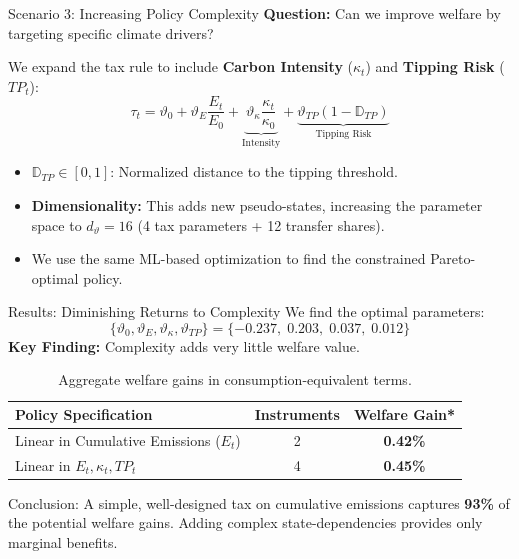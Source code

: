 \documentclass[aspectratio=169,11pt]{beamer}
\begin{document}
\begin{frame}{Scenario 3: Increasing Policy Complexity}
\small
    \textbf{Question:} Can we improve welfare by targeting specific climate drivers?
    \vspace{0.5em}

    We expand the tax rule to include \textbf{Carbon Intensity} ($\kappa_t$) and \textbf{Tipping Risk} ($TP_t$):
    \begin{equation}
        \label{eq:tax_fun_lin_S_kappa_tipping}
        \tau_t = \vartheta_0 + \vartheta_E \frac{E_t}{E_0} + \underbrace{\vartheta_\kappa \frac{\kappa_t}{\kappa_0}}_{\text{Intensity}} + \underbrace{\vartheta_{TP} (1 - \mathbb{D}_{TP})}_{\text{Tipping Risk}}
    \end{equation}
    \begin{itemize}
        \item $\mathbb{D}_{TP} \in [0,1]$: Normalized distance to the tipping threshold.
        \item \textbf{Dimensionality:} This adds new pseudo-states, increasing the parameter space to $d_\vartheta = 16$ (4 tax parameters + 12 transfer shares).
        \item We use the same ML-based optimization to find the constrained Pareto-optimal policy.
    \end{itemize}
\end{frame}

\begin{frame}{Results: Diminishing Returns to Complexity}
\small
    We find the optimal parameters:
    \[
        \{\vartheta_0, \vartheta_E, \vartheta_\kappa, \vartheta_{TP} \} = \{-0.237,\;  0.203, \;  0.037, \;  0.012 \}
    \]
    \textbf{Key Finding:} Complexity adds very little welfare value.
    \begin{table}[h]
        \centering
        \begin{tabular}{lcc}
            \toprule
            \textbf{Policy Specification} & \textbf{Instruments} & \textbf{Welfare Gain*} \\
            \midrule
            Linear in Cumulative Emissions ($E_t$) & 2 & \textbf{0.42\%} \\
            Linear in $E_t, \kappa_t, TP_t$ & 4 & \textbf{0.45\%} \\
            \bottomrule
        \end{tabular}
        \caption{\footnotesize Aggregate welfare gains in consumption-equivalent terms.}
    \end{table}
    \begin{alertblock}{Conclusion:}
        A simple, well-designed tax on cumulative emissions captures \textbf{93\%} of the potential welfare gains. Adding complex state-dependencies provides only marginal benefits.
    \end{alertblock}
\end{frame}
\end{document}
